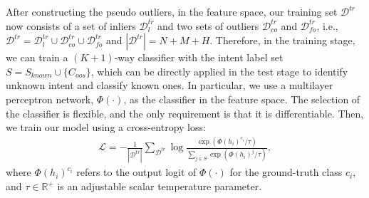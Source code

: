 After constructing the pseudo outliers, in the feature space, our training set $\mathcal{D}^{tr}$ now consists of a set of inliers $\mathcal{D}_{l}^{tr}$ and two sets of outliers $\mathcal{D}_{co}^{tr}$ and $\mathcal{D}_{fo}^{tr}$, i.e., $\mathcal{D}^{tr} = \mathcal{D}_{l}^{tr} \cup \mathcal{D}_{co}^{tr} \cup \mathcal{D}_{fo}^{tr}$ and $|\mathcal{D}^{tr}| = N+M+H$. Therefore, in the training stage, we can train a $(K+1)$-way classifier  with the intent label set $S= S_{known} \cup \{C_{oos}\}$, which can be directly applied in the test stage to identify unknown intent and classify known ones. In particular, we use a multilayer perceptron network, $\Phi(\cdot)$, as the classifier in the feature space. The selection of the classifier is flexible, and the only requirement is that it is differentiable. Then, we train our model using a cross-entropy loss:
\begin{align*}
	\mathcal{L} = 
	- \frac{1}{|\mathcal{D}^{tr}|}\sum_{\mathcal{D}^{tr}}\log \frac{\exp(\Phi(h_i)^{c_i}/\tau)}{\sum_{j\in S}\exp(\Phi(h_i)^j/\tau)},
\end{align*}
where $\Phi(h_i)^{c_i}$ refers to the output logit of $\Phi(\cdot)$ for the ground-truth class $c_i$, and $\tau \in \mathbb{R}^+$ is an adjustable scalar temperature parameter.
